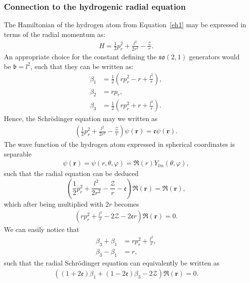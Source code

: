 \documentclass[12pt,a4paper]{report}
\theoremstyle{definition}
\theoremstyle{remark}
\theoremstyle{remark}
\begin{document}
\subsubsection{Connection to the hydrogenic radial equation}
The Hamiltonian of the hydrogen atom from Equation~\ref{eh1} may be expressed in terms of the radial momentum as:
\begin{align*}
H=\frac{1}{2}p_r^2+\frac{l^2}{2r^2}-\frac{\mathcal{Z}}{r}.
\end{align*}
An appropriate choice  for the constant defining the $\mathfrak{so}(2,1)$ generators would be $\mathfrak{b}=l^2$, such that they can be written as:
\begin{equation}\label{eso21.4}\begin{aligned}
\beta_1&=\frac{1}{2}\left(rp_r^2-r+\frac{l^2}{r}\right),\\
\beta_2&=rp_r,\\
\beta_3&=\frac{1}{2}\left(rp_r^2+r+\frac{l^2}{r}\right).
\end{aligned}
\end{equation}
Hence, the Schrödinger equation may we written as
\begin{align*}
\left(\frac{1}{2}p_r^2+\frac{l^2}{2r^2}-\frac{\mathcal{Z}}{r}\right)\psi(\textbf{r})=\mathfrak{e}\psi(\textbf{r}).
\end{align*}
The wave function of the hydrogen atom expressed in spherical coordinates is separable
\begin{align*}
\psi(\textbf{r})=\psi(r,\theta,\varphi)=\mathfrak{R}(r)Y_{lm}(\theta,\varphi),
\end{align*}
such that the radial equation can be deduced
\begin{equation}\label{eso21.2}
\left(\frac{1}{2}p_r^2+\frac{l^2}{2r^2}-\frac{\mathcal{Z}}{r}-\mathfrak{e}\right)\mathfrak{R}(\textbf{r})=\mathfrak{R}(\textbf{r}),
\end{equation}
which after being multiplied with $2r$ becomes
\begin{align*}
\left(rp_r^2+\frac{l^2}{r}-2\mathcal{Z}-2\mathfrak{e}r\right)\mathfrak{R}(\textbf{r})=0.
\end{align*}
We can easily notice that
\begin{align*}
\beta_3+\beta_1&=rp_r^2+\frac{l^2}{r},\\
\beta_3-\beta_1&=r,
\end{align*}
such that the radial Schrödinger equation can equivalently be written as
\begin{align*}
((1+2\mathfrak{e})\beta_1+(1-2\mathfrak{e})\beta_3-2\mathcal{Z})\mathfrak{R}(\textbf{r})=0.
\end{align*}
\end{document}
